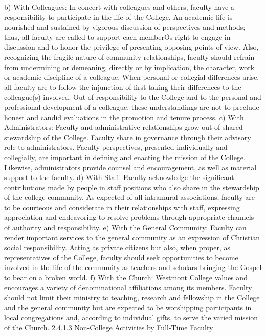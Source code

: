 \documentclass[letterpaper, 11pt]{article}
\begin{document}
	b) With Colleagues:  In concert with colleagues and others, faculty have a responsibility to participate in the life of the College.  An academic life is nourished and sustained by vigorous discussion of perspectives and methods; thus, all faculty are called to support each memberÕs right to engage in discussion and to honor the privilege of presenting opposing points of view.  Also, recognizing the fragile nature of community relationships, faculty should refrain from undermining or demeaning, directly or by implication, the character, work or academic discipline of a colleague. When personal or collegial differences arise, all faculty are to follow the injunction of first taking their differences to the colleague(s) involved.  Out of responsibility to the College and to the personal and professional development of a colleague, these understandings are not to preclude honest and candid evaluations in the promotion and tenure process.
	c) With Administrators:  Faculty and administrative relationships grow out of shared stewardship of the College.  Faculty share in governance through their advisory role to administrators.  Faculty perspectives, presented individually and collegially, are important in defining and enacting the mission of the College.  Likewise, administrators provide counsel and encouragement, as well as material support to the faculty.
	d) With Staff:  Faculty acknowledge the significant contributions made by people in staff positions who also share in the stewardship of the college community.  As expected of all intramural associations, faculty are to be courteous and considerate in their relationships with staff, expressing appreciation and endeavoring to resolve problems through appropriate channels of authority and responsibility.
	e) With the General Community:  Faculty can render important services to the general community as an expression of Christian social responsibility.  Acting as private citizens but also, when proper, as representatives of the College, faculty should seek opportunities to become involved in the life of the community as teachers and scholars bringing the Gospel to bear on a broken world.
	f) With the Church:  Westmont College values and encourages a variety of denominational affiliations among its members.  Faculty should not limit their ministry to teaching, research and fellowship in the College and the general community but are expected to be worshipping participants in local congregations and, according to individual gifts, to serve the varied mission of the Church.
	2.4.1.3 Non-College Activities by Full-Time Faculty
\end{document}

